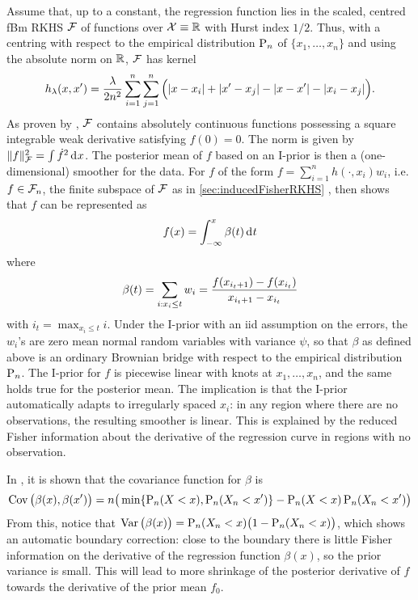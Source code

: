 Assume that, up to a constant, the regression function lies in the scaled, centred fBm RKHS ${\mathcal F}$ of functions over ${\mathcal X} \equiv \mathbb{R}$ with Hurst index $1/2$.
Thus, with a centring with respect to the empirical distribution $\operatorname{P}_n$ of $\{x_1,\dots,x_n\}$ and using the absolute norm on $\mathbb{R}$, ${\mathcal F}$ has kernel
\[
  h_\lambda(x,x') = \frac{\lambda}{2n^2} \sum_{i=1}^n\sum_{j=1}^n \Big( \lvert x-x_i\rvert + \lvert x'-x_j\rvert - \lvert x-x'\rvert - \lvert x_i-x_j\rvert \Big).
\]
As proven by \citet[Section 10]{van2008reproducing}, ${\mathcal F}$ contains absolutely continuous functions possessing a square integrable weak derivative satisfying $f(0)=0$.
The norm is given by $\lVert f\rVert^2_{\mathcal F} = \int \dot f^2 \operatorname{d}\hspace{0.5pt}\! x$.
The posterior mean of $f$ based on an I-prior is then a (one-dimensional) smoother for the data.
For $f$ of the form $f = \sum_{i=1}^n h(\cdot,x_i)w_i$, i.e. $f\in{\mathcal F}_n$, the finite subspace of ${\mathcal F}$ as in \cref{sec:inducedFisherRKHS} , then \citet{bergsma2017} shows that $f$ can be represented as 
\vspace{-0.5em}
\begin{align}\label{eq:ipriorbrownianbridge}
  f(x) = \int_{-\infty}^x \beta(t) \dint t \vspace{-0.5em}
\end{align}
where 
\vspace{-0.5em}
\begin{align}
  \beta(t) = \sum_{i:x_i \leq t} w_i =  \frac{f(x_{i_t + 1}) - f(x_{i_t})}{x_{i_t + 1} - x_{i_t}} \vspace{-0.1em}
\end{align}
with $i_t = \max_{x_i \leq t} i$.
Under the I-prior with an iid assumption on the errors, the $w_i$'s are zero mean normal random variables with variance $\psi$, so that $\beta$ as defined above is an ordinary Brownian bridge with respect to the empirical distribution $\operatorname{P}_n$.
The I-prior for $f$ is piecewise linear with knots at $x_1,\dots,x_n$, and the same holds true for the posterior mean.
The implication is that the I-prior automatically adapts to irregularly spaced $x_i$: in any region where there are no observations, the resulting smoother is linear.
This is explained by the reduced Fisher information about the derivative of the regression curve in regions with no observation.

In \citet{bergsma2017}, it is shown that the covariance function for $\beta$ is 
\[
  \operatorname{Cov}\big(\beta(x),\beta(x') \big) = n \big( \min\{\operatorname{P}_n(X < x), \operatorname{P}_n(X_n < x') \} -  \operatorname{P}_n(X < x) \operatorname{P}_n(X_n < x') \big) 
\]
From this, notice that $\operatorname{Var} \big(\beta(x)\big) = \operatorname{P}_n(X_n < x)\big(1 - \operatorname{P}_n(X_n < x) \big)$, which shows an automatic boundary correction: close to the boundary there is little Fisher information on the derivative of the regression function $\beta(x)$, so the prior variance is small.
This will lead to more shrinkage of the posterior derivative of $f$ towards the derivative of the prior mean $f_0$.

